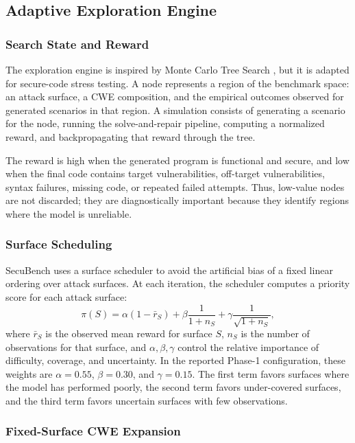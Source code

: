 \documentclass[11pt]{article}
\newcommand{\toolname}{SecuBench}
\begin{document}
\subsection{Adaptive Exploration Engine}

\subsubsection{Search State and Reward}

The exploration engine is inspired by Monte Carlo Tree Search \cite{kocsis2006mcts,majdinasab2025prism}, but it is adapted for secure-code stress testing. A node represents a region of the benchmark space: an attack surface, a CWE composition, and the empirical outcomes observed for generated scenarios in that region. A simulation consists of generating a scenario for the node, running the solve-and-repair pipeline, computing a normalized reward, and backpropagating that reward through the tree.

The reward is high when the generated program is functional and secure, and low when the final code contains target vulnerabilities, off-target vulnerabilities, syntax failures, missing code, or repeated failed attempts. Thus, low-value nodes are not discarded; they are diagnostically important because they identify regions where the model is unreliable.

\subsubsection{Surface Scheduling}

\toolname{} uses a surface scheduler to avoid the artificial bias of a fixed linear ordering over attack surfaces. At each iteration, the scheduler computes a priority score for each attack surface:
\[
    \pi(S) =
    \alpha \left(1-\bar{r}_{S}\right)
    + \beta \frac{1}{1+n_{S}}
    + \gamma \frac{1}{\sqrt{1+n_{S}}},
    \label{eq:surface-priority}
\]
where \(\bar{r}_{S}\) is the observed mean reward for surface \(S\), \(n_{S}\) is the number of observations for that surface, and \(\alpha,\beta,\gamma\) control the relative importance of difficulty, coverage, and uncertainty. In the reported Phase-1 configuration, these weights are \(\alpha=0.55\), \(\beta=0.30\), and \(\gamma=0.15\). The first term favors surfaces where the model has performed poorly, the second term favors under-covered surfaces, and the third term favors uncertain surfaces with few observations.

\subsubsection{Fixed-Surface CWE Expansion}
\end{document}
